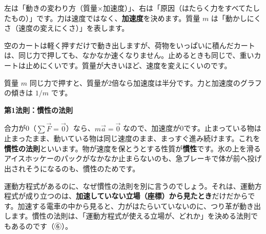 \begin{phyomi}[$m\vec a=\sum\vec F$]
左は「動きの変わり方（質量×加速度）」、右は「原因（はたらく力をすべてたしたもの）」です。力は速度ではなく、\textbf{加速度}を決めます。質量 $m$ は「動かしにくさ（速度の変えにくさ）」を表します。
\end{phyomi}
\begin{phmijika}[買い物カート]
空のカートは軽く押すだけで動き出しますが、荷物をいっぱいに積んだカートは、同じ力で押しても、なかなか速くなりません。止めるときも同じで、重いカートは止めにくいです。質量が大きいほど、速度を変えにくいのです。
\end{phmijika}
\begin{lrbox}{\pxcplota}\end{lrbox}%
\begin{phbaisuru}{質量 $m$}
同じ力で押すと、質量が2倍なら加速度は半分です。力と加速度のグラフの傾きは $1/m$ です。
\begin{bkcenter}
\usebox{\pxcplota}
\end{bkcenter}
\end{phbaisuru}

\noindent\textbf{第1法則：慣性の法則}\par
\noindent\label{ph:力-2:kansei}合力が0（$\sum\vec F=\vec 0$）なら、$m\vec a=\vec 0$ なので、加速度が0です。止まっている物は止まったまま、動いている物は同じ速度のまま、まっすぐ進み続けます。これを\textbf{慣性の法則}といいます。物が速度を保とうとする性質が\textbf{慣性}です。氷の上を滑るアイスホッケーのパックがなかなか止まらないのも、急ブレーキで体が前へ投げ出されそうになるのも、慣性のためです。

運動方程式があるのに、なぜ慣性の法則を別に言うのでしょう。それは、運動方程式が成り立つのは、\textbf{加速していない立場（座標）から見たとき}だけだからです。加速する電車の中から見ると、力がはたらいていないのに、つり革が動き出します。慣性の法則は、「運動方程式が使える立場が、どれか」を決める法則でもあるのです（⑥）。

